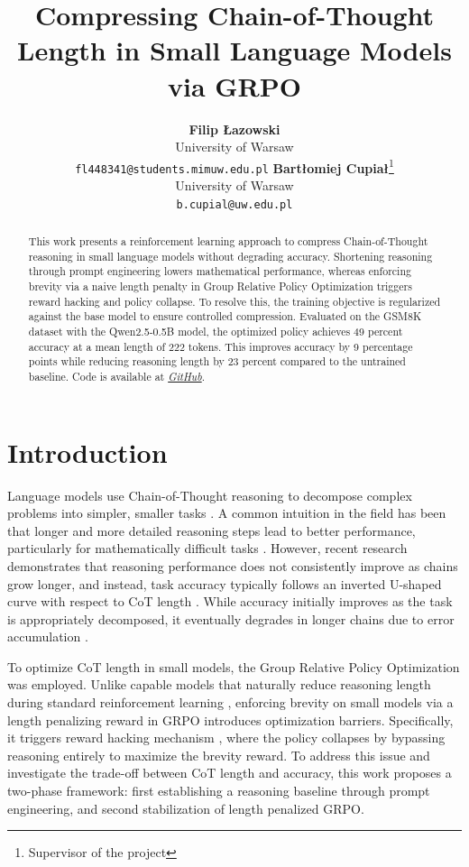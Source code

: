 \documentclass{article}
\title{Compressing Chain-of-Thought Length in Small Language Models via GRPO}
\author{
  \textbf{Filip Łazowski} \\
   University of Warsaw \\
  \texttt{fl448341@students.mimuw.edu.pl}
  \And
  \textbf{Bartłomiej Cupiał}\thanks{Supervisor of the project} \\
   University of Warsaw \\
  \texttt{b.cupial@uw.edu.pl}
}
\begin{document}
\maketitle
\setcounter{footnote}{0}
\begin{abstract}
This work presents a reinforcement learning approach to compress Chain-of-Thought reasoning in small language models without degrading accuracy. Shortening reasoning through prompt engineering lowers mathematical performance, whereas enforcing brevity via a naive length penalty in Group Relative Policy Optimization triggers reward hacking and policy collapse. To resolve this, the training objective is regularized against the base model to ensure controlled compression. Evaluated on the GSM8K dataset with the Qwen2.5-0.5B model, the optimized policy achieves 49 percent accuracy at a mean length of 222 tokens. This improves accuracy by 9 percentage points while reducing reasoning length by 23 percent compared to the untrained baseline. Code is available at \href{https://github.com/fl448341/grpo_cot_compression}{\textit{GitHub}}.
\end{abstract}

\section{Introduction}
Language models use Chain-of-Thought reasoning to decompose complex problems into simpler, smaller tasks \cite{wei2022chain, zhou2022least}. A common intuition in the field has been that longer and more detailed reasoning steps lead to better performance, particularly for mathematically difficult tasks \cite{fu2023complexity, jin2024impact}. However, recent research demonstrates that reasoning performance does not consistently improve as chains grow longer, and instead, task accuracy typically follows an inverted U-shaped curve with respect to CoT length \cite{wu2025when}. While accuracy initially improves as the task is appropriately decomposed, it eventually degrades in longer chains due to error accumulation \cite{wu2025when}.

To optimize CoT length in small models, the Group Relative Policy Optimization \cite{shao2024deepseekmath} was employed. Unlike capable models that naturally reduce reasoning length during standard reinforcement learning \cite{wu2025when}, enforcing brevity on small models via a length penalizing reward in GRPO introduces optimization barriers. Specifically, it triggers reward hacking mechanism \cite{skalse2022defining}, where the policy collapses by bypassing reasoning entirely to maximize the brevity reward. To address this issue and investigate the trade-off between CoT length and accuracy, this work proposes a two-phase framework: first establishing a reasoning baseline through prompt engineering, and second stabilization of length penalized GRPO.
\end{document}
